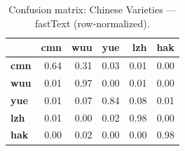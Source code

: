 \begin{table}[htbp]
\centering
\small
\begin{tabular}{lrrrrr}
\toprule
 & \textbf{cmn} & \textbf{wuu} & \textbf{yue} & \textbf{lzh} & \textbf{hak} \\
\midrule
\textbf{cmn} & \cellcolor{blue!64}\color{white}0.64 & \cellcolor{blue!30}0.31 & \cellcolor{blue!3}0.03 & \cellcolor{blue!1}0.01 & \cellcolor{blue!0}0.00 \\
\textbf{wuu} & \cellcolor{blue!1}0.01 & \cellcolor{blue!97}\color{white}0.97 & \cellcolor{blue!0}0.00 & \cellcolor{blue!1}0.01 & \cellcolor{blue!0}0.00 \\
\textbf{yue} & \cellcolor{blue!0}0.01 & \cellcolor{blue!7}0.07 & \cellcolor{blue!83}\color{white}0.84 & \cellcolor{blue!8}0.08 & \cellcolor{blue!0}0.01 \\
\textbf{lzh} & \cellcolor{blue!0}0.01 & \cellcolor{blue!0}0.00 & \cellcolor{blue!1}0.02 & \cellcolor{blue!97}\color{white}0.98 & \cellcolor{blue!0}0.00 \\
\textbf{hak} & \cellcolor{blue!0}0.00 & \cellcolor{blue!1}0.02 & \cellcolor{blue!0}0.00 & \cellcolor{blue!0}0.00 & \cellcolor{blue!98}\color{white}0.98 \\
\bottomrule
\end{tabular}
\caption{Confusion matrix: Chinese Varieties — fastText (row-normalized).}
\label{tab:cm-chinese_varieties-fasttext}
\end{table}